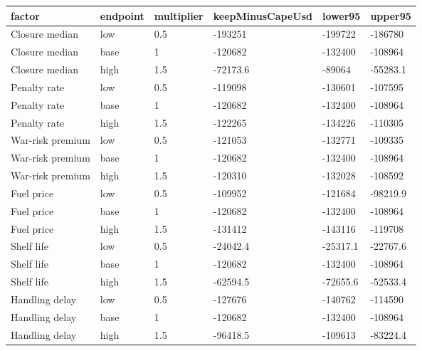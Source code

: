 \begin{tabular}{llllll}
\toprule
factor & endpoint & multiplier & keepMinusCapeUsd & lower95 & upper95 \\
\midrule
Closure median & low & 0.5 & -193251 & -199722 & -186780 \\
Closure median & base & 1 & -120682 & -132400 & -108964 \\
Closure median & high & 1.5 & -72173.6 & -89064 & -55283.1 \\
Penalty rate & low & 0.5 & -119098 & -130601 & -107595 \\
Penalty rate & base & 1 & -120682 & -132400 & -108964 \\
Penalty rate & high & 1.5 & -122265 & -134226 & -110305 \\
War-risk premium & low & 0.5 & -121053 & -132771 & -109335 \\
War-risk premium & base & 1 & -120682 & -132400 & -108964 \\
War-risk premium & high & 1.5 & -120310 & -132028 & -108592 \\
Fuel price & low & 0.5 & -109952 & -121684 & -98219.9 \\
Fuel price & base & 1 & -120682 & -132400 & -108964 \\
Fuel price & high & 1.5 & -131412 & -143116 & -119708 \\
Shelf life & low & 0.5 & -24042.4 & -25317.1 & -22767.6 \\
Shelf life & base & 1 & -120682 & -132400 & -108964 \\
Shelf life & high & 1.5 & -62594.5 & -72655.6 & -52533.4 \\
Handling delay & low & 0.5 & -127676 & -140762 & -114590 \\
Handling delay & base & 1 & -120682 & -132400 & -108964 \\
Handling delay & high & 1.5 & -96418.5 & -109613 & -83224.4 \\
\bottomrule
\end{tabular}
